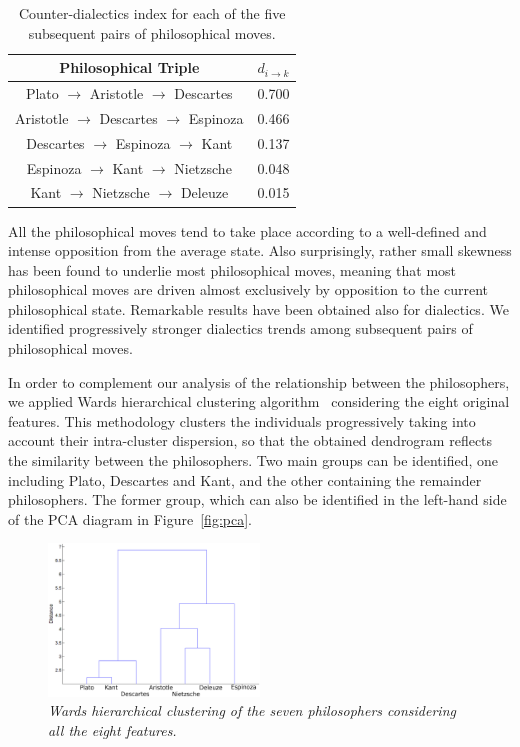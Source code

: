 \documentclass[%
 aip,
 jmp,%
 amsmath,amssymb,
 reprint,%
]{revtex4-1}
\begin{document}
\begin{table}%
\caption{\label{tab:tableE} Counter-dialectics index for each
of the five subsequent pairs of philosophical moves.  }

\begin{tabular}{|c||c|}
\hline
Philosophical Triple & $d_{i \rightarrow k}$ \\
\hline \hline
Plato $\rightarrow$ Aristotle $\rightarrow$ Descartes &  0.700 \\
Aristotle $\rightarrow$ Descartes $\rightarrow$ Espinoza & 0.466 \\
Descartes $\rightarrow$ Espinoza $\rightarrow$ Kant & 0.137 \\
Espinoza $\rightarrow$ Kant $\rightarrow$ Nietzsche & 0.048 \\
Kant $\rightarrow$ Nietzsche $\rightarrow$ Deleuze  & 0.015 \\
\hline
\end{tabular}
\end{table}

All the philosophical moves tend to take place according to a
well-defined and intense opposition from the average state.  Also
surprisingly, rather small skewness has been found to underlie most
philosophical moves, meaning that most philosophical moves are driven
almost exclusively by opposition to the current philosophical state.
Remarkable results have been obtained also for dialectics.  We
identified progressively stronger dialectics trends among subsequent
pairs of philosophical moves.

In order to complement our analysis of the relationship between the
philosophers, we applied Wards hierarchical clustering
algorithm~\cite{Duda,Costa} considering the eight original features.
This methodology clusters the individuals progressively taking into
account their intra-cluster dispersion, so that the obtained
dendrogram reflects the similarity between the philosophers.  Two main
groups can be identified, one including Plato, Descartes and Kant, and
the other containing the remainder philosophers.  The former group,
which can also be identified in the left-hand side of the PCA diagram
in Figure~\ref{fig:pca}.

\begin{figure}
        \begin{center}
                \includegraphics[width=0.5\textwidth]{Dendrogram_.eps}
        \end{center}
        \caption{\it Wards  hierarchical clustering of the seven
                    philosophers considering all the eight features.}
        \label{fig.hier}
\end{figure}
\end{document}
